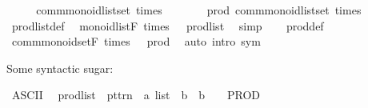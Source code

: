 \begin{isabellebody}
%
\isadelimproof
%
\endisadelimproof
%
\isatagproof
{}\isamarkupfalse%
\ {\isacharminus}{\kern0pt}\isanewline
\ \ \isamarkupfalse%
\ {\isachardoublequoteopen}comm{\isacharunderscore}{\kern0pt}monoid{\isacharunderscore}{\kern0pt}list{\isacharunderscore}{\kern0pt}set\ times\ {}{\isachardoublequoteclose}\ \isacommand{{\isachardot}{\kern0pt}{\isachardot}{\kern0pt}}\isamarkupfalse%
\isanewline
\ \ \isamarkupfalse%
\ \isamarkupfalse%
\ prod{\isacharcolon}{\kern0pt}\ comm{\isacharunderscore}{\kern0pt}monoid{\isacharunderscore}{\kern0pt}list{\isacharunderscore}{\kern0pt}set\ times\ {}\ \isacommand{{\isachardot}{\kern0pt}}\isamarkupfalse%
\isanewline
\ \ \isamarkupfalse%
\ prod{\isacharunderscore}{\kern0pt}list{\isacharunderscore}{\kern0pt}def\ \isamarkupfalse%
\ {\isachardoublequoteopen}monoid{\isacharunderscore}{\kern0pt}list{\isachardot}{\kern0pt}F\ times\ {}\ {\isacharequal}{\kern0pt}\ prod{\isacharunderscore}{\kern0pt}list{\isachardoublequoteclose}\ \isamarkupfalse%
\ simp\isanewline
\ \ \isamarkupfalse%
\ prod{\isacharunderscore}{\kern0pt}def\ \isamarkupfalse%
\ {\isachardoublequoteopen}comm{\isacharunderscore}{\kern0pt}monoid{\isacharunderscore}{\kern0pt}set{\isachardot}{\kern0pt}F\ times\ {}\ {\isacharequal}{\kern0pt}\ prod{\isachardoublequoteclose}\ \isamarkupfalse%
\ {\isacharparenleft}{\kern0pt}auto\ intro{\isacharcolon}{\kern0pt}\ sym{\isacharparenright}{\kern0pt}\isanewline
{}\isamarkupfalse%
%
\endisatagproof
{\isafoldproof}%
%
\isadelimproof
\isanewline
%
\endisadelimproof
\isanewline
{}\isamarkupfalse%
%
\begin{isamarkuptext}%
Some syntactic sugar:%
\end{isamarkuptext}\isamarkuptrue%
\isamarkupfalse%
\ {\isacharparenleft}{\kern0pt}ASCII{\isacharparenright}{\kern0pt}\isanewline
\ \ {\isachardoublequoteopen}{\isacharunderscore}{\kern0pt}prod{\isacharunderscore}{\kern0pt}list{\isachardoublequoteclose}\ {\isacharcolon}{\kern0pt}{\isacharcolon}{\kern0pt}\ {\isachardoublequoteopen}pttrn\ {\isacharequal}{\kern0pt}{\isachargreater}{\kern0pt}\ {\isacharprime}{\kern0pt}a\ list\ {\isacharequal}{\kern0pt}{\isachargreater}{\kern0pt}\ {\isacharprime}{\kern0pt}b\ {\isacharequal}{\kern0pt}{\isachargreater}{\kern0pt}\ {\isacharprime}{\kern0pt}b{\isachardoublequoteclose}\ \ \ \ {\isacharparenleft}{\kern0pt}{\isachardoublequoteopen}{\isacharparenleft}{\kern0pt}{}PROD\ {\isacharunderscore}{\kern0pt}{\isacharless}{\kern0pt}{\isacharminus}{\kern0pt}{\isacharunderscore}{\kern0pt}{\isachardot}{\kern0pt}\ {\isacharunderscore}{\kern0pt}{\isacharparenright}{\kern0pt}{\isachardoublequoteclose}\ {\isacharbrackleft}{\kern0pt}{}{\isacharcomma}{\kern0pt}\ {}{}{\isacharcomma}{\kern0pt}\ {}{}{\isacharbrackright}{\kern0pt}\ {}{}{\isacharparenright}{\kern0pt}\isanewline

\end{isabellebody}
